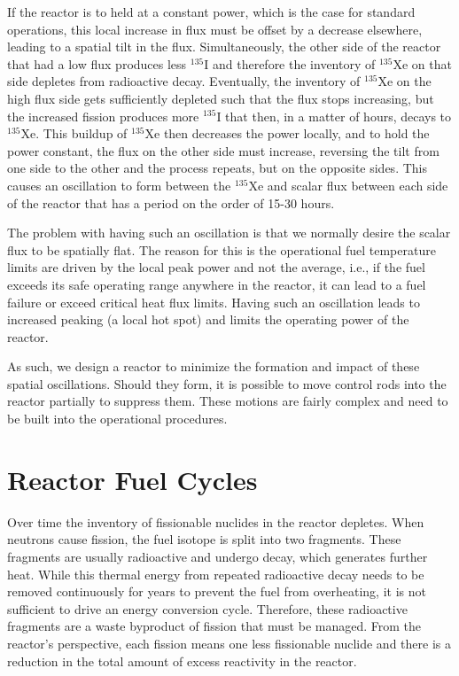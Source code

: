 If the reactor is to held at a constant power, which is the case for standard operations, this local increase in flux must be offset by a decrease elsewhere, leading to a spatial tilt in the flux. Simultaneously, the other side of the reactor that had a low flux produces less $^{135}$I and therefore the inventory of $^{135}$Xe on that side depletes from radioactive decay. Eventually, the inventory of $^{135}$Xe on the high flux side gets sufficiently depleted such that the flux stops increasing, but the increased fission produces more $^{135}$I that then, in a matter of hours, decays to $^{135}$Xe. This buildup of $^{135}$Xe then decreases the power locally, and to hold the power constant, the flux on the other side must increase, reversing the tilt from one side to the other and the process repeats, but on the opposite sides. This causes an oscillation to form between the $^{135}$Xe and scalar flux between each side of the reactor that has a period on the order of 15-30 hours. 

The problem with having such an oscillation is that we normally desire the scalar flux to be spatially flat. The reason for this is the operational fuel temperature limits are driven by the local peak power and not the average, i.e., if the fuel exceeds its safe operating range anywhere in the reactor, it can lead to a fuel failure or exceed critical heat flux limits. Having such an oscillation leads to increased peaking (a local hot spot) and limits the operating power of the reactor. 

As such, we design a reactor to minimize the formation and impact of these spatial oscillations. Should they form, it is possible to move control rods into the reactor partially to suppress them. These motions are fairly complex and need to be built into the operational procedures.

\section{Reactor Fuel Cycles}

Over time the inventory of fissionable nuclides in the reactor depletes. When neutrons cause fission, the fuel isotope is split into two fragments. These fragments are usually radioactive and undergo decay, which generates further heat. While this thermal energy from repeated radioactive decay needs to be removed continuously for years to prevent the fuel from overheating, it is not sufficient to drive an energy conversion cycle. Therefore, these radioactive fragments are a waste byproduct of fission that must be managed. From the reactor's perspective, each fission means one less fissionable nuclide and there is a reduction in the total amount of excess reactivity in the reactor. 

